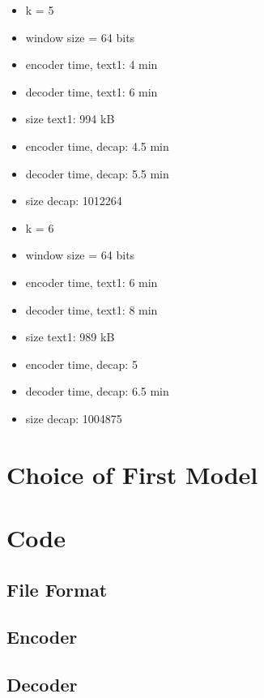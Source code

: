 \documentclass{article}
\begin{document}
\begin{itemize}
\item k = 5
\item window size = 64 bits
\item encoder time, text1: 4 min
\item decoder time, text1: 6 min
\item size text1: 994 kB
\item encoder time, decap: 4.5 min
\item decoder time, decap: 5.5 min
\item size decap: 1012264
\end{itemize}

\begin{itemize}
\item k = 6
\item window size = 64 bits
\item encoder time, text1: 6 min
\item decoder time, text1: 8 min
\item size text1: 989 kB
\item encoder time, decap: 5
\item decoder time, decap: 6.5 min
\item size decap: 1004875
\end{itemize}

\section{Choice of First Model}

\section{Code}

\subsection{File Format}

\subsection{Encoder}

\subsection{Decoder}
\end{document}
